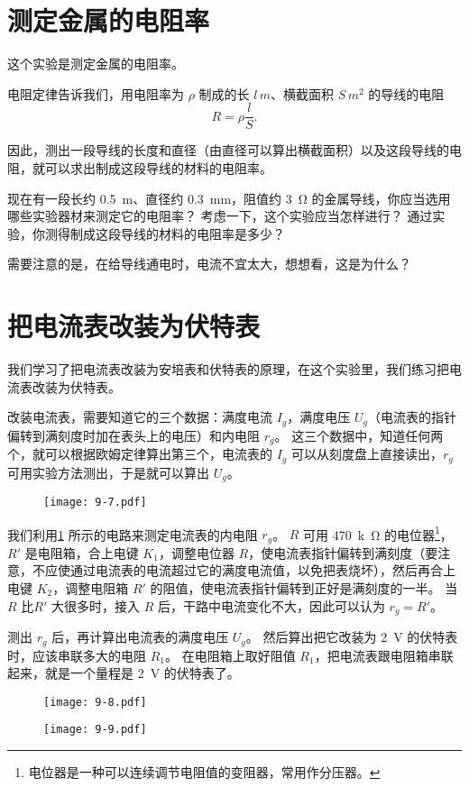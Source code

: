\section{测定金属的电阻率}
这个实验是测定金属的电阻率。

电阻定律告诉我们，用电阻率为 $\rho$ 制成的长 $l\,\unit{m}$、横截面积 $S\,\unit{m^2}$ 的导线的电阻
\[R=\rho\frac{l}{S}.\]

因此，测出一段导线的长度和直径（由直径可以算出横截面积）以及这段导线的电阻，就可以求出制成这段导线的材料的电阻率。

现在有一段长约 \qty{0.5}{m}、直径约 \qty{0.3}{mm}，阻值约 \qty{3}{\ohm} 的金属导线，你应当选用哪些实验器材来测定它的电阻率？
考虑一下，这个实验应当怎样进行？
通过实验，你测得制成这段导线的材料的电阻率是多少？

需要注意的是，在给导线通电时，电流不宜太大，想想看，这是为什么？

\section{把电流表改装为伏特表}
我们学习了把电流表改装为安培表和伏特表的原理，在这个实验里，我们练习把电流表改装为伏特表。

改装电流表，需要知道它的三个数据：满度电流 $I_g$，满度电压 $U_g$（电流表的指针偏转到满刻度时加在表头上的电压）和内电阻 $r_g$。
这三个数据中，知道任何两个，就可以根据欧姆定律算出第三个，电流表的 $I_g$ 可以从刻度盘上直接读出，$r_g$ 可用实验方法测出，于是就可以算出 $U_g$。
\begin{figure}
  \texttt{[image: 9-7.pdf]}    
  \caption{}\label{fig:9-7}
\end{figure}

我们利用\cref{fig:9-7} 所示的电路来测定电流表的内电阻 $r_g$。
$R$ 可用 \qty{470}{k\ohm} 的电位器\footnote{电位器是一种可以连续调节电阻值的变阻器，常用作分压器。}，$R'$ 是电阻箱，合上电键 $K_1$，调整电位器 $R$，使电流表指针偏转到满刻度（要注意，不应使通过电流表的电流超过它的满度电流值，以免把表烧坏），然后再合上电键 $K_2$，调整电阻箱 $R'$ 的阻值，使电流表指针偏转到正好是满刻度的一半。
当 $R$ 比$R'$ 大很多时，接入 $R$ 后，干路中电流变化不大，因此可以认为 $r_g=R'$。


测出 $r_g$ 后，再计算出电流表的满度电压 $U_g$。
然后算出把它改装为 \qty{2}{V} 的伏特表时，应该串联多大的电阻 $R_1$。
在电阻箱上取好阻值 $R_1$，把电流表跟电阻箱串联起来，就是一个量程是 \qty{2}{V} 的伏特表了。
\begin{figure}
  \begin{minipage}[b]{0.48\linewidth}\centering
    \texttt{[image: 9-8.pdf]}
    \caption{}\label{fig:9-8}
  \end{minipage}
  \begin{minipage}[b]{0.48\linewidth}\centering
    \texttt{[image: 9-9.pdf]}  
    \caption{}\label{fig:9-9}
  \end{minipage}
\end{figure}

